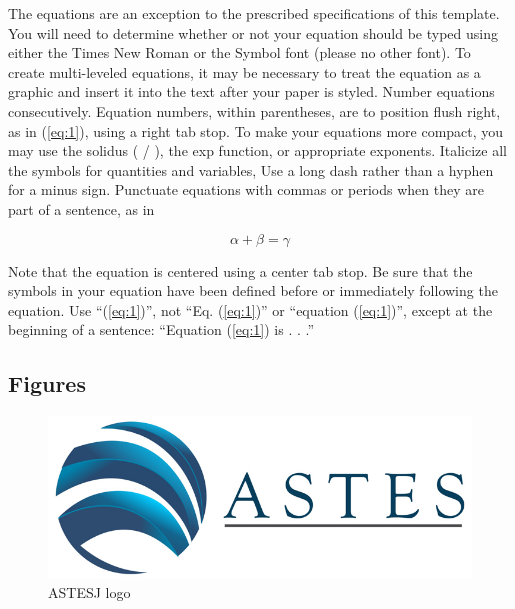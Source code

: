 \documentclass{article} %
\renewcommand{\headrulewidth}{0pt }
\begin{document}
\begin{multicols}{2}
The equations are an exception to the prescribed specifications of this template. You will need to determine whether or not your equation should be typed using either the Times New Roman or the Symbol font (please no other font). To create multi-leveled equations, it may be necessary to treat the equation as a graphic and insert it into the text after your paper is styled.
Number equations consecutively. Equation numbers, within parentheses, are to position flush right, as in (\ref{eq:1}), using a right tab stop. To make your equations more compact, you may use the solidus ( / ), the exp function, or appropriate exponents. Italicize all the symbols for quantities and variables, Use a long dash rather than a hyphen for a minus sign. Punctuate equations with commas or periods when they are part of a sentence, as in

\begin{equation}
\label{eq:1}
\alpha+\beta=\gamma
\end{equation}

Note that the equation is centered using a center tab stop. Be sure that the symbols in your equation have been defined before or immediately following the equation. Use ``(\ref{eq:1})'', not ``Eq. (\ref{eq:1})'' or ``equation (\ref{eq:1})'', except at the beginning of a sentence: ``Equation (\ref{eq:1}) is . . .''



\fancyhead{}
\renewcommand{\headrulewidth}{1pt }
\fancyfoot{}
\fancyfoot[R]{\thepage}

\subsection{Figures}

\begin{figure}[H]
	\centering
	\includegraphics[width=\linewidth]{images/ASTES_Logo.jpg}
	\caption{\footnotesize{ASTESJ logo}}    
		\label{astesj}
	\end{figure}


\end{multicols}
\end{document}
